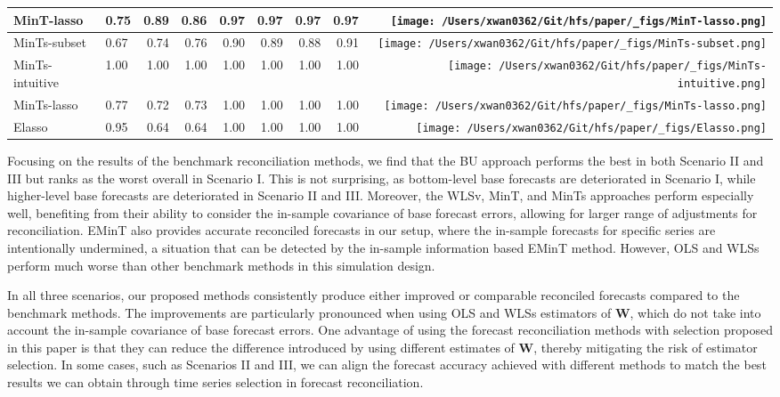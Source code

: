 \documentclass[11pt,a4paper,]{article}
\begin{document}
\begin{table}[!h]
{\begin{tabular}{llrrrrrr>{}r}
MinT-lasso & 0.75 & 0.89 & 0.86 & 0.97 & 0.97 & 0.97 & 0.97 & \texttt{[image: /Users/xwan0362/Git/hfs/paper/\_figs/MinT-lasso.png]}\\
\midrule
MinTs-subset & 0.67 & 0.74 & 0.76 & 0.90 & 0.89 & 0.88 & 0.91 & \texttt{[image: /Users/xwan0362/Git/hfs/paper/\_figs/MinTs-subset.png]}\\
MinTs-intuitive & 1.00 & 1.00 & 1.00 & 1.00 & 1.00 & 1.00 & 1.00 & \texttt{[image: /Users/xwan0362/Git/hfs/paper/\_figs/MinTs-intuitive.png]}\\
MinTs-lasso & 0.77 & 0.72 & 0.73 & 1.00 & 1.00 & 1.00 & 1.00 & \texttt{[image: /Users/xwan0362/Git/hfs/paper/\_figs/MinTs-lasso.png]}\\
\midrule
Elasso & 0.95 & 0.64 & 0.64 & 1.00 & 1.00 & 1.00 & 1.00 & \texttt{[image: /Users/xwan0362/Git/hfs/paper/\_figs/Elasso.png]}\\
\bottomrule
\end{tabular}}
\end{table}

Focusing on the results of the benchmark reconciliation methods, we find
that the BU approach performs the best in both Scenario II and III but
ranks as the worst overall in Scenario I. This is not surprising, as
bottom-level base forecasts are deteriorated in Scenario I, while
higher-level base forecasts are deteriorated in Scenario II and III.
Moreover, the WLSv, MinT, and MinTs approaches perform especially well,
benefiting from their ability to consider the in-sample covariance of
base forecast errors, allowing for larger range of adjustments for
reconciliation. EMinT also provides accurate reconciled forecasts in our
setup, where the in-sample forecasts for specific series are
intentionally undermined, a situation that can be detected by the
in-sample information based EMinT method. However, OLS and WLSs perform
much worse than other benchmark methods in this simulation design.

In all three scenarios, our proposed methods consistently produce either
improved or comparable reconciled forecasts compared to the benchmark
methods. The improvements are particularly pronounced when using OLS and
WLSs estimators of \(\boldsymbol{W}\), which do not take into account
the in-sample covariance of base forecast errors. One advantage of using
the forecast reconciliation methods with selection proposed in this
paper is that they can reduce the difference introduced by using
different estimates of \(\boldsymbol{W}\), thereby mitigating the risk
of estimator selection. In some cases, such as Scenarios II and III, we
can align the forecast accuracy achieved with different methods to match
the best results we can obtain through time series selection in forecast
reconciliation.
\end{document}
